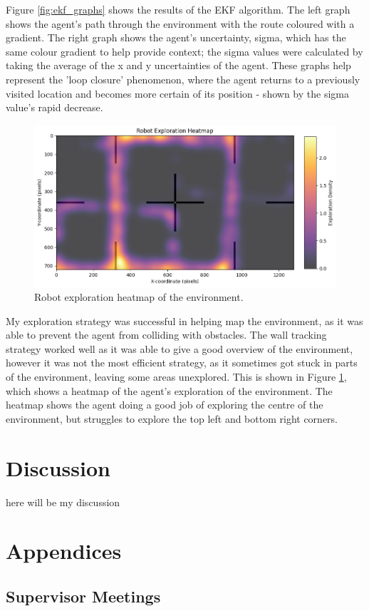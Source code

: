 \documentclass[12pt]{article}
\begin{document}
Figure \ref{fig:ekf_graphs} shows the results of the EKF algorithm. The left graph shows the agent's path through the environment
with the route coloured with a gradient. The right graph shows the agent's uncertainty, sigma, which has the same colour gradient
to help provide context; the sigma values were calculated by taking the average of the x and y uncertainties of the agent. These
graphs help represent the 'loop closure' phenomenon, where the agent returns to a previously visited location and becomes more
certain of its position - shown by the sigma value's rapid decrease.\\
\begin{figure}[h]
    \centering
    \includegraphics[width=0.7\linewidth]{heatmap}
    \caption[Short caption]{Robot exploration heatmap of the environment.}
    \label{fig:heatmap}
\end{figure}
My exploration strategy was successful in helping map the environment, as it was able to prevent the agent from colliding with
obstacles. The wall tracking strategy worked well as it was able to give a good overview of the environment, however it was
not the most efficient strategy, as it sometimes got stuck in parts of the environment, leaving some areas unexplored. This is
shown in Figure \ref{fig:heatmap}, which shows a heatmap of the agent's exploration of the environment. The heatmap shows the
agent doing a good job of exploring the centre of the environment, but struggles to explore the top left and bottom right corners.\\

\section{Discussion}
here will be my discussion

\section{Appendices}

\subsection{Supervisor Meetings}    %
\end{document}
